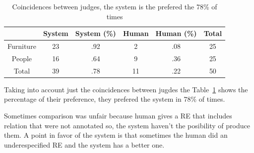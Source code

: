 \begin{table}[h!]
\begin{center}
\begin{tabular}{|c|c|c|c|c|c|}
\hline
           & System & System (\%) & Human & Human (\%) & Total\\
\hline
Furniture & 23  & .92 &  2 & .08  & 25 \\
People    & 16  & .64 & 9  & .36 & 25 \\
\hline
Total     & 39  & .78    & 11 & .22 & 50  \\
\hline
\end{tabular}
\caption{Coincidences between judges, the system is the prefered the 78\% of times} 
\label{system-better}
\end{center}
\end{table}
Taking into account just the coincidences between jugdes the Table~\ref{system-better} shows the percentage of their preference, they prefered the system in 78\% of times.

Sometimes comparison was unfair because human gives a RE that includes relation that were not annotated so, the system haven't the posibility of produce them. A point in favor of the system is that sometimes the human did an underespecified RE and the system has a better one.\\


